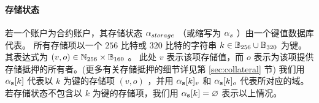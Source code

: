 \paragraph{存储状态}

若一个账户为合约账户，其存储状态 $\mathbf{\alpha}_{storage}$ （或缩写为 $\mathbf{\alpha}_{s}$ ）由一个键值数据库代表。
所有存储项以一个 $256$ 比特或 $320$ 比特的字符串 $k\in \mathbb{B}_{256}\cup \mathbb{B}_{320}$ 为键。其表达式为 $(v,o)\in \mathbb{N}_{256}\times \mathbb{B}_{160}$ 。
此处 $v$ 表示该项存储值，而 $o$ 表示为该项提供存储抵押的所有者。(更多有关存储抵押的细节详见第 \ref{sec:collateral} 节)
我们用 $\mathbf{\alpha}_{\bf s}[k]$ 代表以 $k$ 为键的存储项 $(v,o)$ ，并用 $\mathbf{\alpha}_{\bf s}[k]_v$ 和 $\mathbf{\alpha}_{\bf s}[k]_o$ 代表所对应的域。
若存储状态不包含以 $k$ 为键的存储项，我们用 $\mathbf{\alpha}_{\bf s}[k]=\varnothing$ 表示以上情况。




